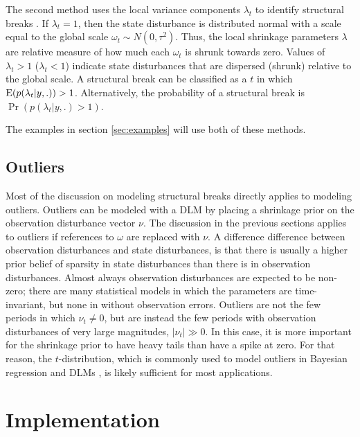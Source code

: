 \documentclass{article}
\begin{document}
The second method uses the local variance components $\lambda_{t}$ to identify structural breaks \parencite[179-180]{PetrisPetroneOmegal2009}.
If $\lambda_{t} = 1$, then the state disturbance is distributed normal with a scale equal to the global scale $\omega_{t} \sim N(0, \tau^{2})$.
Thus, the local shrinkage parameters $\lambda$ are relative measure of how much each $\omega_{t}$ is shrunk towards zero.
Values of $\lambda_{t} > 1$ ($\lambda_{t} < 1$) indicate state disturbances that are dispersed (shrunk) relative to the global scale.
A structural break can be classified as a $t$ in which $\operatorname{E} (p(\lambda_{t} | y, .)) > 1$.
Alternatively, the probability of a structural break is $\Pr(p(\lambda_{t} | y, .) > 1)$.

The examples in section \ref{sec:examples} will use both of these methods.

\subsection{Outliers}
\label{sec:outliers}

Most of the discussion on modeling structural breaks directly applies to modeling outliers.
Outliers can be modeled with a DLM by placing a shrinkage prior on the observation disturbance vector $\nu$. 
The discussion in the previous sections applies to outliers if references to $\omega$ are replaced with $\nu$.
A difference difference between observation disturbances and state disturbances, is that there is usually a higher prior belief of sparsity in state disturbances than there is in observation disturbances.
Almost always observation disturbances are expected to be non-zero;
there are many statistical models in which the parameters are time-invariant, but none in without observation errors.%
Outliers are not the few periods in which $\nu_{t} \neq 0$, but are instead the few periods with observation disturbances of very large magnitudes, $|\nu_{t}| \gg 0$.
In this case, it is more important for the shrinkage prior to have heavy tails than have a spike at zero. 
For that reason, the $t$-distribution, which is commonly used to model outliers in Bayesian regression and DLMs \parencite{West1984}, is likely sufficient for most applications.

\section{Implementation}
\label{sec:implementation}
\end{document}
